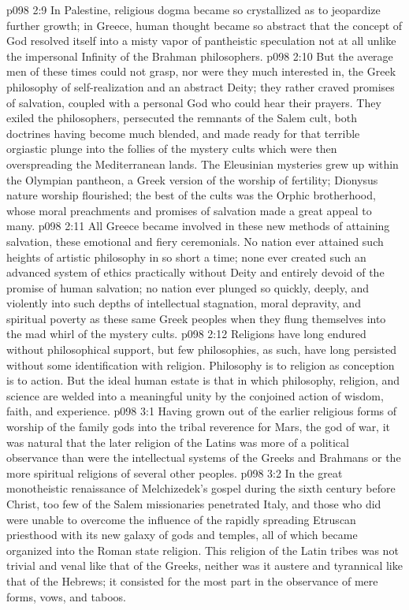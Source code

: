 \vs p098 2:9 In Palestine, religious dogma became so crystallized as to jeopardize further growth; in Greece, human thought became so abstract that the concept of God resolved itself into a misty vapor of pantheistic speculation not at all unlike the impersonal Infinity of the Brahman philosophers.
\pc \vs p098 2:10 But the average men of these times could not grasp, nor were they much interested in, the Greek philosophy of self\hyp{}realization and an abstract Deity; they rather craved promises of salvation, coupled with a personal God who could hear their prayers. They exiled the philosophers, persecuted the remnants of the Salem cult, both doctrines having become much blended, and made ready for that terrible orgiastic plunge into the follies of the mystery cults which were then overspreading the Mediterranean lands. The Eleusinian mysteries grew up within the Olympian pantheon, a Greek version of the worship of fertility; Dionysus nature worship flourished; the best of the cults was the Orphic brotherhood, whose moral preachments and promises of salvation made a great appeal to many.
\vs p098 2:11 All Greece became involved in these new methods of attaining salvation, these emotional and fiery ceremonials. No nation ever attained such heights of artistic philosophy in so short a time; none ever created such an advanced system of ethics practically without Deity and entirely devoid of the promise of human salvation; no nation ever plunged so quickly, deeply, and violently into such depths of intellectual stagnation, moral depravity, and spiritual poverty as these same Greek peoples when they flung themselves into the mad whirl of the mystery cults.
\pc \vs p098 2:12 Religions have long endured without philosophical support, but few philosophies, as such, have long persisted without some identification with religion. Philosophy is to religion as conception is to action. But the ideal human estate is that in which philosophy, religion, and science are welded into a meaningful unity by the conjoined action of wisdom, faith, and experience.
\vs p098 3:1 Having grown out of the earlier religious forms of worship of the family gods into the tribal reverence for Mars, the god of war, it was natural that the later religion of the Latins was more of a political observance than were the intellectual systems of the Greeks and Brahmans or the more spiritual religions of several other peoples.
\vs p098 3:2 In the great monotheistic renaissance of Melchizedek’s gospel during the sixth century before Christ, too few of the Salem missionaries penetrated Italy, and those who did were unable to overcome the influence of the rapidly spreading Etruscan priesthood with its new galaxy of gods and temples, all of which became organized into the Roman state religion. This religion of the Latin tribes was not trivial and venal like that of the Greeks, neither was it austere and tyrannical like that of the Hebrews; it consisted for the most part in the observance of mere forms, vows, and taboos.
